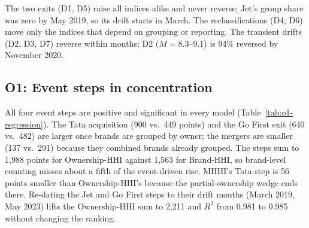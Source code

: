 \documentclass[12pt,a4paper]{article}
\newif\ifoneon
\newcommand{\oneHL}{\par\oneontrue\color{orange}\captionsetup{font+={color=blue}}}
\begin{document}
{The two exits (D1, D5) raise all indices alike and never reverse; Jet's group share was zero by May 2019, so its drift starts in March. The reclassifications (D4, D6) move only the indices that depend on grouping or reporting. The transient drifts (D2, D3, D7) reverse within months; D2 ($M=8.3$--9.1) is 94\% reversed by November 2020.
\par}

{\oneHL \subsection{O1: Event steps in concentration}
All four event steps are positive and significant in every model (Table~\ref{tab:o1-regression}). The Tata acquisition (900 vs.\ 449 points) and the Go First exit (640 vs.\ 482) are larger once brands are grouped by owner; the mergers are smaller (137 vs.\ 291) because they combined brands already grouped. The steps sum to 1,988 points for Ownership-HHI against 1,563 for Brand-HHI, so brand-level counting misses about a fifth of the event-driven rise. MHHI's Tata step is 56 points smaller than Ownership-HHI's because the partial-ownership wedge ends there. Re-dating the Jet and Go First steps to their drift months (March 2019, May 2023) lifts the Ownership-HHI sum to 2,211 and $R^2$ from 0.981 to 0.985 without changing the ranking.

}
\end{document}
